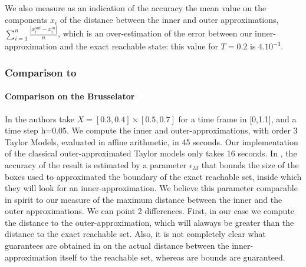 We also measure as an indication of the accuracy the mean value on the components $x_i$ of the distance between the inner and outer approximations, $\sum_{i=1}^n \frac{|x_i^{out} - x_i^{in}|}{n}$,
which is an over-estimation of the error between our inner-approximation and the exact reachable state: this value for $T=0.2$ is $4.10^{-3}$.




\subsubsection{Comparison to \cite{underapprox16}}
\paragraph{Comparison on the Brusselator}
In \cite{underapprox16} the authors take $X=[0.3, 0.4] \times [0.5, 0.7]$ for a time frame in [0,1.1], and a time step h=0.05. 
We compute the inner and outer-approximations, with order 3 Taylor Models, evaluated in affine arithmetic, in 45 seconds.
Our implementation of the classical outer-approximated Taylor models only takes 16 seconds. 
In \cite{underapprox16}, the accuracy of the result is estimated by a parameter $\epsilon_M$ that bounds the size of 
the boxes used to approximated the boundary of the exact reachable set, inside which they will look for an inner-approximation. 
We believe this parameter comparable in spirit 
to our measure of the maximum distance between the inner and the outer approximations. We can point 2 differences. First, in our case 
we compute the distance to the outer-approximation, which will alaways be greater than the distance to the exact reachable set.
Also, it is not completely clear what guarantees are obtained in  \cite{underapprox16} on the actual distance between the inner-approximation itself 
to the reachable set, whereas are bounds are guaranteed. 


